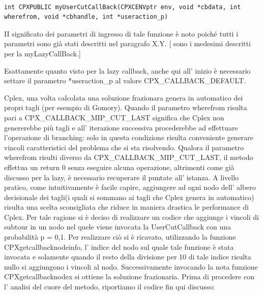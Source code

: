 \documentclass[11pt]{article}
\begin{document}
\begin{lstlisting}

int CPXPUBLIC myUserCutCallBack(CPXCENVptr env, void *cbdata, int wherefrom, void *cbhandle, int *useraction_p)

\end{lstlisting}

II significato dei parametri di ingresso di tale funzione è noto poiché tutti i parametri sono già stati descritti nel paragrafo X.Y. [ sono i medesimi descritti per la myLazyCallBack.]


Esattamente quanto visto per la lazy callback, anche qui all' inizio è necessario settare il parametro *useraction_p al valore CPX_CALLBACK_DEFAULT. 


Cplex, una volta calcolata una soluzione frazionara genera in automatico dei propri tagli (per esempio di Gomory). Quando il parametro wherefrom risulta pari a CPX_CALLBACK_MIP_CUT_LAST significa che Cplex non genererebbe più tagli e all’ iterazione successiva procederebbe ad effettuare l’operazione di branching: solo in questa condizione risulta conveniente generare vincoli caratteristici del problema che si sta risolvendo. Qualora il parametro wherefrom risulti diverso da CPX_CALLBACK_MIP_CUT_LAST, il metodo effettua un return 0 senza eseguire alcuna operazione, altrimenti come già discusso per la lazy, è necessario recuperare il puntate all’ istanza.
A livello pratico, come intuitivamente è facile capire, aggiungere ad ogni nodo dell’ albero decisionale dei tagli(i quali si sommano ai tagli che Cplex genera in automatico) risulta una scelta sconsigliata che riduce in maniera drastica le performance di Cplex. Per tale ragione si è deciso di realizzare un codice che aggiunge i vincoli di subtour in un nodo nel quele viene invocata la UserCutCallback con una probabilità p = 0,1. Per realizzare ciò si è ricavato, utilizzando la funzione CPXgetcallbacknodeinfo, l’ indice del nodo sul quale tale funzione è stata invocata e solamente quando il resto della divisione per 10 di tale indice risulta nullo si aggiungono i vincoli al nodo. Successivamente invocando la nota funzione CPXgetcallbacknodex si ottiene la soluzione frazionaria. Prima di procedere con l’ analisi del cuore del metodo, riportiamo il codice fin qui discusso:
\end{document}
